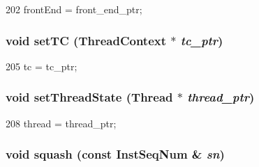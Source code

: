 \begin{DoxyCode}
202     { frontEnd = front_end_ptr; }
\end{DoxyCode}
\hypertarget{classBackEnd_ac6ccaaea6ac518cab92f71723b5a739e}{
\subsubsection[{setTC}]{\setlength{\rightskip}{0pt plus 5cm}void setTC ({\bf ThreadContext} $\ast$ {\em tc\_\-ptr})}}
\label{classBackEnd_ac6ccaaea6ac518cab92f71723b5a739e}



\begin{DoxyCode}
205     { tc = tc_ptr; }
\end{DoxyCode}
\hypertarget{classBackEnd_a850bea4a9b9f631e7b6a4c7dc92f662a}{
\subsubsection[{setThreadState}]{\setlength{\rightskip}{0pt plus 5cm}void setThreadState ({\bf Thread} $\ast$ {\em thread\_\-ptr})}}
\label{classBackEnd_a850bea4a9b9f631e7b6a4c7dc92f662a}



\begin{DoxyCode}
208     { thread = thread_ptr; }
\end{DoxyCode}
\hypertarget{classBackEnd_adc9b67ce59b0b2e930cfaf6361ce42c5}{
\subsubsection[{squash}]{\setlength{\rightskip}{0pt plus 5cm}void squash (const {\bf InstSeqNum} \& {\em sn})}}
\label{classBackEnd_adc9b67ce59b0b2e930cfaf6361ce42c5}



